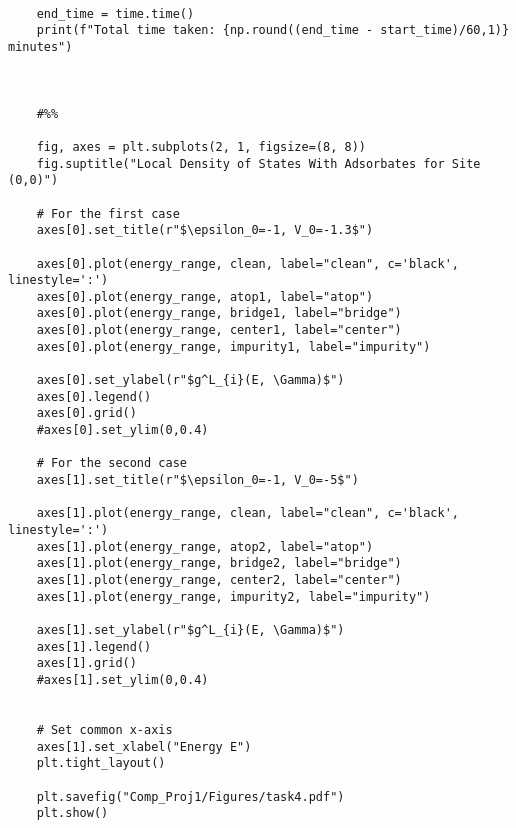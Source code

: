\begin{verbatim}
    
    end_time = time.time()
    print(f"Total time taken: {np.round((end_time - start_time)/60,1)} minutes")
    
    
    
    #%%
    
    fig, axes = plt.subplots(2, 1, figsize=(8, 8))
    fig.suptitle("Local Density of States With Adsorbates for Site (0,0)")
    
    # For the first case 
    axes[0].set_title(r"$\epsilon_0=-1, V_0=-1.3$")
    
    axes[0].plot(energy_range, clean, label="clean", c='black', linestyle=':')
    axes[0].plot(energy_range, atop1, label="atop")
    axes[0].plot(energy_range, bridge1, label="bridge")
    axes[0].plot(energy_range, center1, label="center")
    axes[0].plot(energy_range, impurity1, label="impurity")
    
    axes[0].set_ylabel(r"$g^L_{i}(E, \Gamma)$")
    axes[0].legend()
    axes[0].grid()
    #axes[0].set_ylim(0,0.4)
    
    # For the second case 
    axes[1].set_title(r"$\epsilon_0=-1, V_0=-5$")
    
    axes[1].plot(energy_range, clean, label="clean", c='black', linestyle=':')
    axes[1].plot(energy_range, atop2, label="atop")
    axes[1].plot(energy_range, bridge2, label="bridge")
    axes[1].plot(energy_range, center2, label="center")
    axes[1].plot(energy_range, impurity2, label="impurity")
    
    axes[1].set_ylabel(r"$g^L_{i}(E, \Gamma)$")
    axes[1].legend()
    axes[1].grid()
    #axes[1].set_ylim(0,0.4)
    
    
    # Set common x-axis
    axes[1].set_xlabel("Energy E")
    plt.tight_layout()
    
    plt.savefig("Comp_Proj1/Figures/task4.pdf")
    plt.show()    
\end{verbatim}